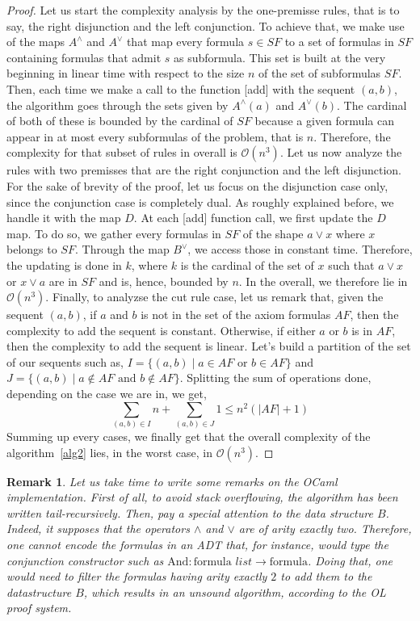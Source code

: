 \documentclass[a4paper, 11pt]{article}
\newtheorem*{remark}{Remark}
\begin{document}
    \begin{proof}
	    Let us start the complexity analysis by the one-premisse rules, that is to say, the right 
	    disjunction and the left conjunction. To achieve that, we make use of the maps $A^\wedge$
	    and $A^\vee$ that map every formula $s\in SF$ to a set of formulas in $SF$ containing 
	    formulas
	    that admit $s$ as subformula. This set is built at the very beginning in linear time with
	    respect to the size $n$ of the set of subformulas $SF$. Then, each time we make a call to the
	    function [add] with the sequent $(a,b)$, the algorithm goes through the sets given by 
	    $A^\wedge(a)$ and $A^\vee(b)$. The cardinal of both of these is bounded by the cardinal of 
	    $SF$ because a given formula can appear in at most every subformulas of the problem, that
	    is $n$. Therefore, the complexity for that subset of rules in overall is $\mathcal{O}(n^3)$. 
	    Let us now
	    analyze the rules with two premisses that are the right conjunction and the left disjunction.
	    For the sake of brevity of the proof, let us focus on the disjunction case only, since the 
	    conjunction case is completely dual. As roughly explained before, we handle it with the
	    map $D$. At each [add] function call, we first update the $D$ map. To do so,
	    we gather every formulas in $SF$ of the shape $a\vee x$ where $x$ belongs to $SF$. Through 
	    the map $B^\vee$, we access those in constant time. Therefore, the updating is done in $k$, 
	    where $k$ is the cardinal of the set of $x$ such that $a\vee x$ or $x\vee a$ are in $SF$ 
	    and is,
	    hence, bounded by $n$. In the overall, we therefore lie in $\mathcal{O}(n^3)$.
	    Finally, to analyzse the cut rule case, let us remark that, given the sequent $(a,b)$, if 
	    $a$ and $b$ is not in the set
	    of the axiom formulas $AF$, then the complexity to add the sequent is constant. Otherwise,
	    if either $a$ or $b$ is in $AF$, then the complexity to add the sequent is linear. Let's
	    build a partition of the set of our sequents such as, 
	    $I=\{(a,b)\mid a\in AF\text{ or }b\in AF\}$ and 
	    $J=\{(a,b)\mid a\not\in AF\text{ and }b\not\in AF\}$.
	    Splitting the sum of operations done, depending on the case we are in, we get,
	    \[ 
		    \sum_{(a,b)\in I}n+\sum_{(a,b)\in J}1\le n^2(|AF|+1) 
	    \]
	    Summing up every cases, we finally get that the overall complexity of the 
	    algorithm~\ref{alg2} lies, in the worst case, in $\mathcal{O}(n^3)$.
    \end{proof}
    \begin{remark}
	    Let us take time to write some remarks on the OCaml implementation. First of all, to avoid
	    stack overflowing, the algorithm has been written tail-recursively. Then, pay a special 
	    attention
	    to the data structure $B$. Indeed, it supposes that the operators $\wedge$ and $\vee$ are of
	    arity exactly two. Therefore, one cannot encode the formulas in an ADT that, for instance,
	    would type the conjunction constructor such as 
	    $\text{And}:\text{formula }list\rightarrow\text{formula}$. Doing that, one would need to
	    filter the formulas having arity exactly $2$ to add them to the datastructure $B$, which
	    results in an unsound algorithm, according to the OL proof system.
    \end{remark}
\end{document}
